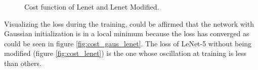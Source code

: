 \begin{figure}[htb]
    \caption{Cost function of Lenet and Lenet Modified.} \label{fig:CostModLeNet}
\end{figure}

Visualizing the loss during the training, could be affirmed that the network with Gaussian initialization is in a local minimum because the loss has converged as could be seen in figure \ref{fig:cost_gaus_lenet}. The loss of LeNet-5 without being modified (figure  \ref{fig:cost_lenet}) is the one whose oscillation at training is less than others.\\

